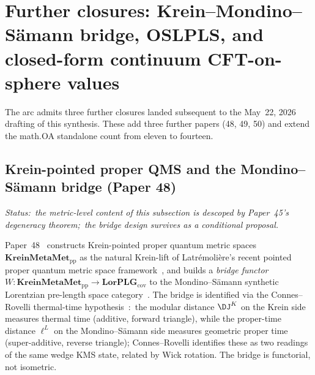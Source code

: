 \documentclass[11pt,a4paper]{article}
\theoremstyle{plain}
\theoremstyle{definition}
\begin{document}
\section{Further closures: Krein--Mondino--S\"amann bridge, OSLPLS,
and closed-form continuum CFT-on-sphere values}
\label{sec:closures_post_47}

The arc admits three further closures landed subsequent to the
May~22, 2026 drafting of this synthesis.  These add three further
papers (48, 49, 50) and extend the math.OA standalone count from eleven
to fourteen.

\subsection{Krein-pointed proper QMS and the Mondino--S\"amann bridge
(Paper 48)}
\label{sec:closures_paper48}

\emph{Status:\ the metric-level content of this
subsection is descoped by Paper~45's degeneracy theorem;\ the bridge
design survives as a conditional proposal.}

Paper~48~\cite{paper48} constructs Krein-pointed proper quantum metric
spaces $\mathbf{KreinMetaMet}_{\mathrm{pp}}$ as the natural Krein-lift
of Latr\'emoli\`ere's recent pointed proper quantum metric space
framework~\cite{latremoliere2025_hypertopology}, and builds a
\emph{bridge functor} $W: \mathbf{KreinMetaMet}_{\mathrm{pp}} \to
\mathbf{LorPLG}_{\mathrm{cov}}$ to the Mondino--S\"amann synthetic
Lorentzian pre-length space category~\cite{minguzzi_suhr2024,
mondino_samann2025}.  The bridge is identified via the
Connes--Rovelli thermal-time hypothesis~\cite{connes_rovelli1994}:\
the modular distance $\mathrm{\DJ}^{K}$ on the Krein side measures
thermal time (additive, forward triangle), while the proper-time
distance $\ell^{L}$ on the Mondino--S\"amann side measures geometric
proper time (super-additive, reverse triangle); Connes--Rovelli
identifies these as two readings of the same wedge KMS state, related
by Wick rotation.  The bridge is functorial, not isometric.
\end{document}
